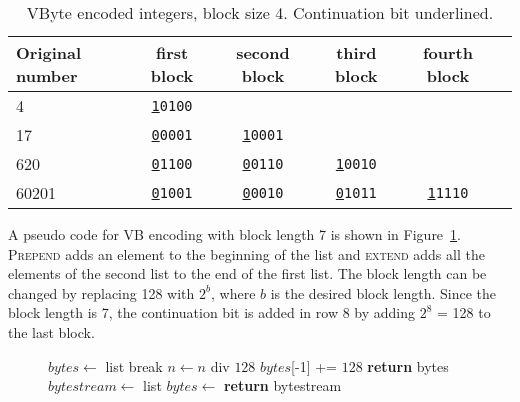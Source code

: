 \begin{table}
\centering
\begin{tabular}{l||c c c c c} 
Original number & first block & second block & third block & fourth block &\\ 
\hline \hline 
4  & \texttt{\underline{1}0100}    &                             &                           &  &  \\
17  & \texttt{\underline{0}0001}   & \texttt{\underline{1}0001}  &                           &  &  \\
620  & \texttt{\underline{0}1100}  & \texttt{\underline{0}0110} & \texttt{\underline{1}0010} &  &  \\
60201 & \texttt{\underline{0}1001} & \texttt{\underline{0}0010} & \texttt{\underline{0}1011} & \texttt{\underline{1}1110} &  \\

\hline
\end{tabular}
\caption{VByte encoded integers, block size 4. Continuation bit underlined.\label{table:vbytes}}
\end{table}

A pseudo code for VB encoding with block length 7 is shown in Figure~\ref{vbyte_enc}. \textsc{Prepend} adds an element to the beginning of the list and 
\textsc{extend} adds all the elements of the second list to the end of the first list. The block length can be changed by replacing 128 with $2^b$, where $b$ is the desired block length. Since the block 
length is 7, the continuation bit is added in row 8 by adding $2^8$ = 128 to the last block.

\begin{figure}[ht]
\centering
  \begin{minipage}{0.5\linewidth}
\begin{algorithmic}[1]
\State $bytes\gets $ list
\State {}
 \State break \EndIf
\State $n\gets n$ div $128$
\EndWhile
\State $bytes$[-1] += $128$
\State \textbf{return} bytes
\EndFunction
\medskip
\medskip
{}
\State $bytestream\gets $ list
\State $bytes \gets$ 
\State {}
\EndFor
\State \textbf{return} bytestream
\EndFunction

\end{algorithmic}
\end{minipage}
 \label{vbyte_enc}
\end{figure}

